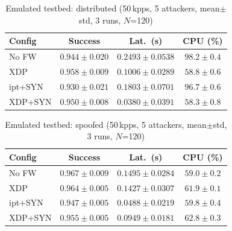 \documentclass[conference]{IEEEtran}
\begin{document}
\begin{table}[h]
\centering
\caption{Emulated testbed: distributed (50\,kpps, 5 attackers,
mean$\pm$std, 3 runs, $N$=120)}
\label{tab:distributed_emu_stats}
\footnotesize
\setlength{\tabcolsep}{4pt}
\begin{tabular}{|l|c|c|c|}
\hline
\textbf{Config} & \textbf{Success} & \textbf{Lat.\ (s)} &
\textbf{CPU (\%)} \\
\hline
No FW   & $0.944{\pm}0.020$ & $0.2493{\pm}0.0538$ & $98.2{\pm}0.4$ \\
XDP     & $0.958{\pm}0.009$ & $0.1006{\pm}0.0289$ & $58.8{\pm}0.6$ \\
ipt+SYN & $0.930{\pm}0.021$ & $0.1803{\pm}0.0701$ & $96.7{\pm}0.6$ \\
XDP+SYN & $0.950{\pm}0.008$ & $0.0380{\pm}0.0391$ & $58.3{\pm}0.8$ \\
\hline
\end{tabular}
\end{table}

\begin{table}[h]
\centering
\caption{Emulated testbed: spoofed (50\,kpps, 5 attackers,
mean$\pm$std, 3 runs, $N$=120)}
\label{tab:spoofed_emu_stats}
\footnotesize
\setlength{\tabcolsep}{4pt}
\begin{tabular}{|l|c|c|c|}
\hline
\textbf{Config} & \textbf{Success} & \textbf{Lat.\ (s)} &
\textbf{CPU (\%)} \\
\hline
No FW   & $0.967{\pm}0.009$ & $0.1495{\pm}0.0284$ & $59.0{\pm}0.2$ \\
XDP     & $0.964{\pm}0.005$ & $0.1427{\pm}0.0307$ & $61.9{\pm}0.1$ \\
ipt+SYN & $0.947{\pm}0.005$ & $0.0488{\pm}0.0219$ & $59.8{\pm}0.4$ \\
XDP+SYN & $0.955{\pm}0.005$ & $0.0949{\pm}0.0181$ & $62.8{\pm}0.3$ \\
\hline
\end{tabular}
\end{table}
\end{document}
